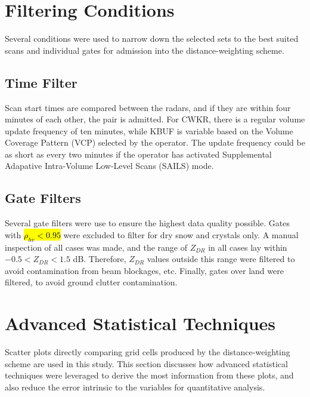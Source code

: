 \section{Filtering Conditions}
Several conditions were used to narrow down the selected sets to the best suited scans and individual gates for admission into the distance-weighting scheme.
\subsection{Time Filter}
Scan start times are compared between the radars, and if they are within four minutes of each other, the pair is admitted. For CWKR, there is a regular
volume update frequency of ten minutes, while KBUF is variable based on the Volume Coverage Pattern (VCP) selected by the operator. The update frequency
could be as short as every two minutes if the operator has activated Supplemental Adapative Intra-Volume Low-Level Scans (SAILS) mode.
\subsection{Gate Filters}
Several gate filters were use to ensure the highest data quality possible. Gates with \hl{$\rho_{hv} < 0.95$} were excluded to filter for dry snow and crystals
only. A manual inspection of all cases was made, and the range of $Z_{DR}$ in all cases lay within $-0.5 < Z_{DR} < 1.5$ dB. Therefore, $Z_{DR}$ values
outside this range were filtered to avoid contamination from beam blockages, etc. Finally, gates over land were filtered, to avoid ground clutter
contamination.
\section{Advanced Statistical Techniques}
Scatter plots directly comparing grid cells produced by the distance-weighting scheme are used in this study. This section discusses how advanced statistical
techniques were leveraged to derive the most information from these plots, and also reduce the error intrinsic to the variables for quantitative analysis.
